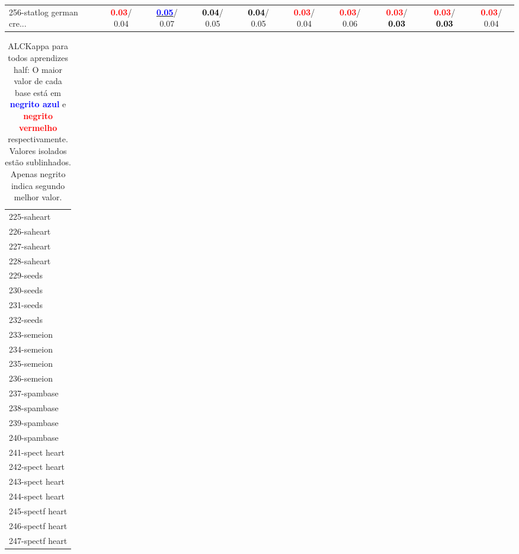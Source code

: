 \begin{table}[h]
\begin{center}
{\begin{tabular}{lc|c|c|c|c|c|c|c|c}
256-statlog german cre... & \textcolor{red}{\textbf{  0.03}}/  0.04 & \underline{\textcolor{blue}{\textbf{  0.05}}}/  0.07 & \textcolor{black}{\textbf{  0.04}}/  0.05 & \textcolor{black}{\textbf{  0.04}}/  0.05 & \textcolor{red}{\textbf{  0.03}}/  0.04 & \textcolor{red}{\textbf{  0.03}}/  0.06 & \textcolor{red}{\textbf{  0.03}}/\textcolor{black}{\textbf{  0.03}} & \textcolor{red}{\textbf{  0.03}}/\textcolor{black}{\textbf{  0.03}} & \textcolor{red}{\textbf{  0.03}}/  0.04 \\\end{tabular}}\label{stratsALCKappa7AllReduxhalfa}
\end{center}
\end{table}
\begin{table}[h]
\caption{ALCKappa para todos aprendizes half: O maior valor de cada base está em \textcolor{blue}{\textbf{negrito azul}} e \textcolor{red}{\textbf{negrito vermelho}} respectivamente. Valores isolados estão sublinhados. Apenas negrito indica segundo melhor valor.}
\begin{center}\begin{tabular}{l}
 & \\ \hline 225-saheart &  \\
226-saheart &  \\
227-saheart &  \\
228-saheart &  \\
229-seeds &  \\
230-seeds &  \\
231-seeds &  \\ \hline
232-seeds &  \\
233-semeion &  \\
234-semeion &  \\
235-semeion &  \\
236-semeion &  \\
237-spambase &  \\
238-spambase &  \\ \hline
239-spambase &  \\
240-spambase &  \\
241-spect heart &  \\
242-spect heart &  \\
243-spect heart &  \\
244-spect heart &  \\
245-spectf heart &  \\ \hline
246-spectf heart &  \\
247-spectf heart &  \\

\end{tabular}
\end{center}
\end{table}
